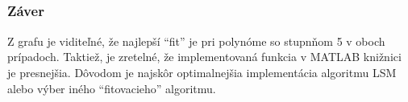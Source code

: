\documentclass[11pt]{article}
\begin{document}
    \begin{Verbatim}[commandchars=\\\{\}]







    \end{Verbatim}

    \begin{center}
    \end{center}
    { \hspace*{\fill} \\}
    
    \hypertarget{zuxe1ver}{%
\subsubsection{Záver}\label{zuxe1ver}}

Z grafu je viditeľné, že najlepší ``fit'' je pri polynóme so stupnňom 5
v oboch prípadoch. Taktiež, je zretelné, že implementovaná funkcia v
MATLAB knižnici je presnejšia. Dôvodom je najskôr optimalnejšia
implementácia algoritmu LSM alebo výber iného ``fitovacieho'' algoritmu.


    
    
    
\end{document}
